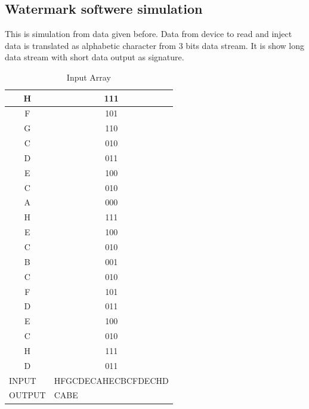 \documentclass[10pt,journal,compsoc]{IEEEtran}
\begin{document}
\subsection{Watermark softwere simulation}
This is simulation from data given before. Data from device to read and inject data is translated as alphabetic character from 3 bits data stream. It is show long data stream with short data output as signature.
{\renewcommand{\arraystretch}{1.2}
\begin{table}[h]
	\centering
	\caption{Input Array}
	\label{inputarray}
	\begin{tabular}{|c|c|}
		\hline
		H                            & 111                                      \\ \hline
		F                            & 101                                      \\ \hline
		G                            & 110                                      \\ \hline
		C                            & 010                                      \\ \hline
		D                            & 011                                      \\ \hline
		E                            & 100                                      \\ \hline
		C                            & 010                                      \\ \hline
		A                            & 000                                      \\ \hline
		H                            & 111                                      \\ \hline
		E                            & 100                                      \\ \hline
		C                            & 010                                      \\ \hline
		B                            & 001                                      \\ \hline
		C                            & 010                                      \\ \hline
		F                            & 101                                      \\ \hline
		D                            & 011                                      \\ \hline
		E                            & 100                                      \\ \hline
		C                            & 010                                      \\ \hline
		H                            & 111                                      \\ \hline
		D                            & 011                                      \\ \hline
		\multicolumn{1}{|l|}{INPUT}  & \multicolumn{1}{l|}{HFGCDECAHECBCFDECHD} \\ \hline
		\multicolumn{1}{|l|}{OUTPUT} & \multicolumn{1}{l|}{CABE}                \\ \hline
	\end{tabular}
\end{table}
}
\end{document}
